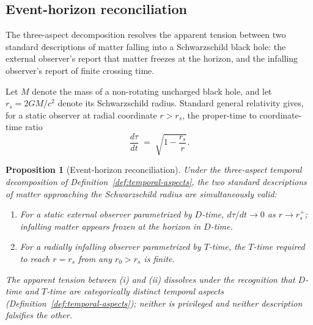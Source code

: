 \documentclass[11pt,a4paper]{article}
\newtheorem{proposition}[theorem]{Proposition}
\theoremstyle{definition}
\theoremstyle{remark}
\begin{document}
\subsection{Event-horizon reconciliation}\label{subsec:horizon}

The three-aspect decomposition resolves the apparent tension between two standard descriptions of matter falling into a Schwarzschild black hole: the external observer's report that matter freezes at the horizon, and the infalling observer's report of finite crossing time.

Let $M$ denote the mass of a non-rotating uncharged black hole, and let $r_{s} = 2GM/c^{2}$ denote its Schwarzschild radius. Standard general relativity gives, for a static observer at radial coordinate $r > r_{s}$, the proper-time to coordinate-time ratio
\begin{equation}\label{eq:schwarzschild-ratio}
\frac{d\tau}{dt} \;=\; \sqrt{1 - \frac{r_{s}}{r}}.
\end{equation}

\begin{proposition}[Event-horizon reconciliation]\label{prop:horizon}
Under the three-aspect temporal decomposition of Definition~\ref{def:temporal-aspects}, the two standard descriptions of matter approaching the Schwarzschild radius are simultaneously valid:
\begin{enumerate}[leftmargin=*,label=(\roman*)]
\item For a static external observer parametrized by $D$-time, $d\tau/dt \to 0$ as $r \to r_{s}^{+}$; infalling matter appears frozen at the horizon in $D$-time.
\item For a radially infalling observer parametrized by $T$-time, the $T$-time required to reach $r = r_{s}$ from any $r_{0} > r_{s}$ is finite.
\end{enumerate}
The apparent tension between (i) and (ii) dissolves under the recognition that $D$-time and $T$-time are categorically distinct temporal aspects (Definition~\ref{def:temporal-aspects}); neither is privileged and neither description falsifies the other.
\end{proposition}
\end{document}

